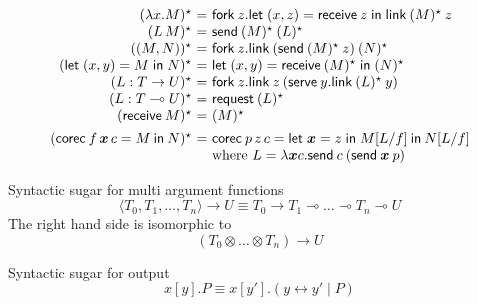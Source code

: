 \documentclass[orivec,envcountsame]{llncs}
\makeatletter
\newcommand{\lto}{\ensuremath{\multimap}}
\newcommand{\uto}{\ensuremath{\rightarrow}}
\newcommand{\mkwd}[1]{\mathsf{#1}}
\newcommand{\link}[2]{#1 \leftrightarrow #2}
\newcommand{\gvsend}[2]{\mkwd{send}\:#1\:#2}
\newcommand{\gvreceive}[1]{\mkwd{receive}\:#1}
\newcommand{\gvlet}[3]{\mkwd{let}\;#1 = #2\;\mkwd{in}\;#3}
\newcommand{\gvlink}[2]{\mkwd{link}\:#1\:#2}
\newcommand{\gvfork}[2]{\mkwd{fork}\:#1.#2}
\newcommand{\gvletrec}[3]{\mkwd{corec}\:#1 = #2\:\mkwd{in}\:#3}
\newcommand{\gvserve}[2]{\mkwd{serve}\:#1.#2}
\newcommand{\gvrequest}[1]{\mkwd{request}\:#1}
\newcommand{\topi}[1]{({#1})^\star}
\newcommand{\ba}{\begin{array}}
\newcommand{\ea}{\end{array}}
\newenvironment{equations}{\[\ba{@{}r@{~}c@{~}l@{}}}{\ea\]}
\makeatother
\begin{document}
\begin{equations}
\topi{\lambda x.M} &=& \gvfork{z}{\gvlet{(x, z)}{\gvreceive{z}}{\gvlink{\topi{M}}{z}}} \\
\topi{L\,M} &=& \gvsend{\topi{M}}{\topi{L}} \\
\topi{(M, N)} &=&
  \gvfork{z}
    {\gvlink{(\gvsend{\topi{M}}{z})}{\topi{N}}} \\
\topi{\gvlet{(x, y)}{M}{N}} &=&
    \gvlet{(x, y)}{\gvreceive{\topi{M}}}{\topi{N}} \\
\topi{L : T \uto U} &=&
  \gvfork{z}{\gvlink{z}{(\gvserve{y}{\gvlink{\topi{L}}{y}})}} \\
\topi{L : T \lto U} &=& \gvrequest{\topi{L}} \\
\topi{\gvreceive{M}} &=& \topi{M}
\\[1ex]
\topi{\gvletrec{f\,\vec{x}\,c}{M}{N}} &=&
  \gvletrec{p\,z\,c}{\gvlet{\vec{x}}{z}{M[L/f]}}{N[L/f]} \\
&& \text{where }L = \lambda \vec{x} c.\gvsend{c}{(\gvsend{\vec{x}}{p})} \\
\end{equations}%

Syntactic sugar for multi argument functions
\[
\langle T_0, T_1, \dots, T_n \rangle \uto U
\equiv
T_0 \uto T_1 \lto \dots \lto T_n \lto U
\]
The right hand side is isomorphic to
\[
(T_0 \otimes \dots \otimes T_n) \uto U
\]

Syntactic sugar for output
\[
x[y].P \equiv x[y'].(\link{y}{y'} \mid P)
\]
\end{document}
